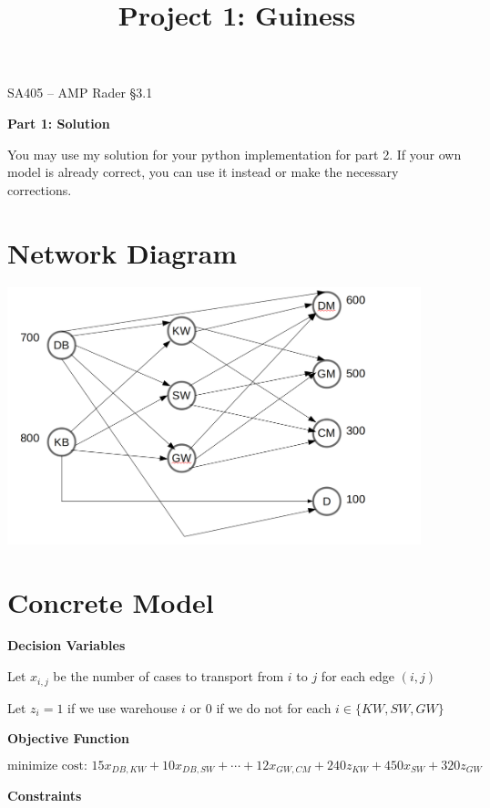 \documentclass[11pt]{article}
\makeatletter
\theoremstyle{definition}
\renewcommand{\maketitle}{
  \noindent SA405 -- AMP \hfill Rader \S 3.1 \\

  \begin{center}\Large{\textbf{\@title}}\end{center}
}
\makeatother
\begin{document}
  
\title{Project 1:  Guiness}

\maketitle

\textbf{Part 1: Solution}

You may use my solution for your python implementation for part 2. If your own model is already correct, you can use it instead or make the necessary corrections.

\section{Network Diagram}

\includegraphics[width=0.9\textwidth]{Guiness-network.png}

\newpage

\section{Concrete Model}

\textbf{Decision Variables}

Let $x_{i,j}$ be the number of cases to transport from $i$ to $j$ for each edge $(i,j)$

Let $z_i = 1$ if we use warehouse $i$ or $0$ if we do not for each $i \in \{KW, SW, GW\}$

\textbf{Objective Function}

\[
\text{minimize cost: } 15 x_{DB,KW} + 10 x_{DB,SW} + \cdots + 12 x_{GW,CM} + 240 z_{KW} + 450 x_{SW} + 320 z_{GW}
\]

\textbf{Constraints}
\end{document}

